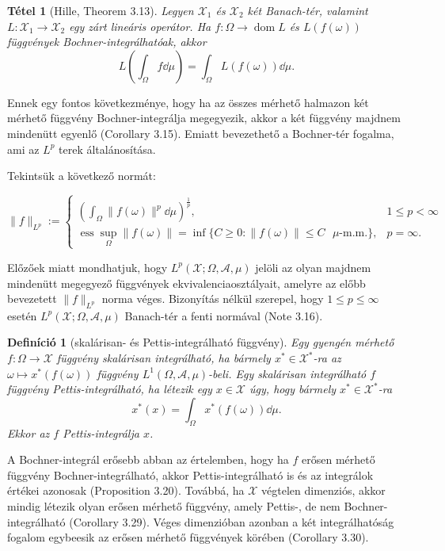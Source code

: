 \documentclass[handout]{beamer} %
\newtheorem{theo}[lem]{Tétel}
\newtheorem{defi}[lem]{Definíció}
\DeclareMathOperator{\dom}{dom}
\DeclareMathOperator{\ess}{ess}
\begin{document}
\begin{frame}
\justifying
\begin{theo}[Hille, Theorem 3.13] Legyen $\mathcal{X}_1$ és $\mathcal{X}_2$ két Banach-tér, valamint $L \colon \mathcal{X}_1 \to \mathcal{X}_2$ egy zárt lineáris operátor. Ha $f \colon \Omega \to \dom L$ és $L(f(\omega))$ függvények Bochner-integrálhatóak, akkor
$$L\left(\int_{\Omega} f \dd{\mu} \right) = \int_{\Omega} L(f(\omega)) \dd{\mu}.$$
\end{theo}
Ennek egy fontos következménye, hogy ha az összes mérhető halmazon két mérhető függvény Bochner-integrálja megegyezik, akkor a két függvény majdnem mindenütt egyenlő (Corollary 3.15). Emiatt bevezethető a Bochner-tér fogalma, ami az $L^p$ terek általánosítása.

Tekintsük a következő normát:

\begin{displaymath}
 \| f \|_{L^p} := \left\{
    \begin{array}{ll}
      \left(\int_{\Omega} \| f(\omega) \|^p  \dd{\mu} \right)^{\frac{1}{p}}, &  1 \leqslant p < \infty \\
      \ess\sup_{\Omega} \|f(\omega)\| = \inf \lbrace C \geqslant 0 : \|f(\omega)\| \leqslant C \text{ $\mu$-m.m.} \rbrace, &  p = \infty.
    \end{array}
  \right.
\end{displaymath}
\end{frame}

\begin{frame} 
\justifying
Előzőek miatt mondhatjuk, hogy $L^p(\mathcal{X}; \Omega, \mathcal{A}, \mu)$ jelöli az olyan majdnem mindenütt megegyező függvények ekvivalenciaosztályait, amelyre az előbb bevezetett $\| f \|_{L^p}$ norma véges. Bizonyítás nélkül szerepel, hogy $1 \leqslant p \leqslant \infty$ esetén $L^p(\mathcal{X}; \Omega, \mathcal{A}, \mu)$ Banach-tér a fenti normával (Note 3.16).
\end{frame}

\begin{frame}
\justifying
\begin{defi}[skalárisan- és Pettis-integrálható függvény] Egy gyengén mérhető $f \colon \Omega \to \mathcal{X}$ függvény skalárisan integrálható, ha bármely $x^* \in \mathcal{X}^*$-ra az $\omega \mapsto x^*(f(\omega))$ függvény $L^1(\Omega, \mathcal{A},\mu)$-beli. Egy skalárisan integrálható $f$ függvény Pettis-integrálható, ha létezik egy $x \in \mathcal{X}$ úgy, hogy bármely $x^* \in \mathcal{X}^*$-ra
$$x^*(x) = \int_{\Omega} x^*(f(\omega))\dd{\mu}.$$
Ekkor az $f$ Pettis-integrálja $x$.
\end{defi}
A Bochner-integrál erősebb abban az értelemben, hogy ha $f$ erősen mérhető függvény Bochner-integrálható, akkor Pettis-integrálható is és az integrálok értékei azonosak (Proposition 3.20). Továbbá, ha $\mathcal{X}$ végtelen dimenziós, akkor mindig létezik olyan erősen mérhető függvény, amely Pettis-, de nem Bochner-integrálható (Corollary 3.29). Véges dimenzióban azonban a két integrálhatóság fogalom egybeesik az erősen mérhető függvények körében (Corollary 3.30).
\end{frame}
\end{document}
